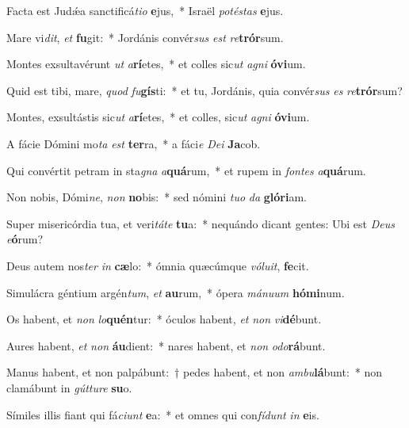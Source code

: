 \item Facta est Judǽa sanctificá\textit{ti}\textit{o} \textbf{e}jus,~* Israël \textit{pot}\textit{és}\textit{tas} \textbf{e}jus.
\item Mare vi\textit{dit}, \textit{et} \textbf{fu}git:~* Jordánis convér\textit{sus} \textit{est} \textit{re}\textbf{trór}sum.
\item Montes exsultavérunt \textit{ut} \textit{a}\textbf{rí}etes,~* et colles sic\textit{ut} \textit{a}\textit{gni} \textbf{ó}\textbf{vi}um.
\item Quid est tibi, mare, \textit{quod} \textit{fu}\textbf{gís}ti:~* et tu, Jordánis, quia convér\textit{sus} \textit{es} \textit{re}\textbf{trór}sum?
\item Montes, exsultástis sic\textit{ut} \textit{a}\textbf{rí}etes,~* et colles, sic\textit{ut} \textit{a}\textit{gni} \textbf{ó}\textbf{vi}um.
\item A fácie Dómini mo\textit{ta} \textit{est} \textbf{ter}ra,~* a fáci\textit{e} \textit{De}\textit{i} \textbf{Ja}cob.
\item Qui convértit petram in sta\textit{gna} \textit{a}\textbf{quá}rum,~* et rupem in \textit{fon}\textit{tes} \textit{a}\textbf{quá}rum.
\item Non nobis, Dómi\textit{ne}, \textit{non} \textbf{no}bis:~* sed nómini \textit{tu}\textit{o} \textit{da} \textbf{gló}\textbf{ri}am.
\item Super misericórdia tua, et veri\textit{tá}\textit{te} \textbf{tu}a:~* nequándo dicant gentes: Ubi est \textit{De}\textit{us} \textit{e}\textbf{ó}rum?
\item Deus autem nos\textit{ter} \textit{in} \textbf{cæ}lo:~* ómnia quæcúmque \textit{vó}\textit{lu}\textit{it}, \textbf{fe}cit.
\item Simulácra géntium argén\textit{tum}, \textit{et} \textbf{au}rum,~* ópera \textit{má}\textit{nu}\textit{um} \textbf{hó}\textbf{mi}num.
\item Os habent, et \textit{non} \textit{lo}\textbf{quén}tur:~* óculos habent, \textit{et} \textit{non} \textit{vi}\textbf{dé}bunt.
\item Aures habent, \textit{et} \textit{non} \textbf{áu}dient:~* nares habent, et \textit{non} \textit{o}\textit{do}\textbf{rá}bunt.
\item Manus habent, et non palpábunt:~† pedes habent, et non \textit{am}\textit{bu}\textbf{lá}bunt:~* non clamábunt in \textit{gút}\textit{tu}\textit{re} \textbf{su}o.
\item Símiles illis fiant qui fá\textit{ci}\textit{unt} \textbf{e}a:~* et omnes qui con\textit{fí}\textit{dunt} \textit{in} \textbf{e}is.
